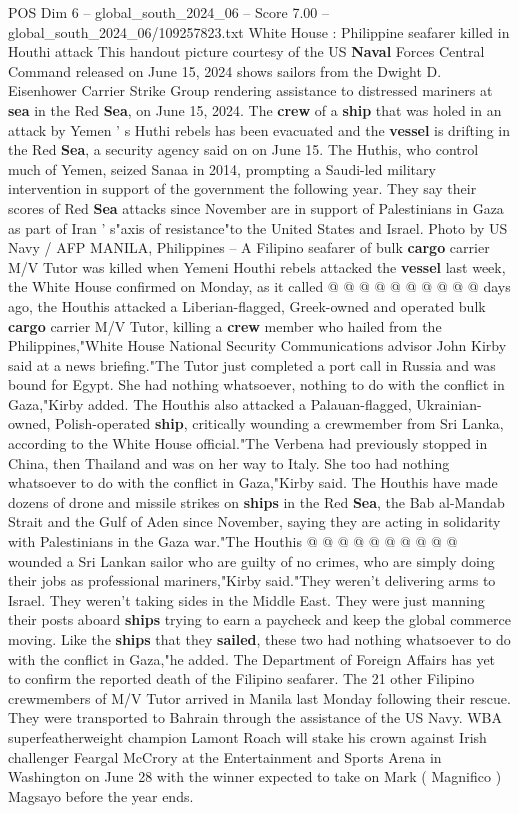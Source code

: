 \begin{textsample}{POS Dim 6 – global\_south\_2024\_06 – Score 7.00 – global\_south\_2024\_06/109257823.txt}  \label{ex:f6_pos_154}
White House : Philippine seafarer killed in Houthi attack This handout picture courtesy of the US \textbf{Naval} Forces Central Command released on June 15, 2024 shows sailors from the Dwight D.
Eisenhower Carrier Strike Group rendering assistance to distressed mariners at \textbf{sea} in the Red \textbf{Sea}, on June 15, 2024.
The \textbf{crew} of a \textbf{ship} that was holed in an attack by Yemen ' s Huthi rebels has been evacuated and the \textbf{vessel} is drifting in the Red \textbf{Sea}, a security agency said on on June 15.
The Huthis, who control much of Yemen, seized Sanaa in 2014, prompting a Saudi-led military intervention in support of the government the following year.
They say their scores of Red \textbf{Sea} attacks since November are in support of Palestinians in Gaza as part of Iran ' s"axis of resistance"to the United States and Israel.
Photo by US Navy / AFP MANILA, Philippines -- A Filipino seafarer of bulk \textbf{cargo} carrier M/V Tutor was killed when Yemeni Houthi rebels attacked the \textbf{vessel} last week, the White House confirmed on Monday, as it called @ @ @ @ @ @ @ @ @ @ days ago, the Houthis attacked a Liberian-flagged, Greek-owned and operated bulk \textbf{cargo} carrier M/V Tutor, killing a \textbf{crew} member who hailed from the Philippines,"White House National Security Communications advisor John Kirby said at a news briefing."The Tutor just completed a port call in Russia and was bound for Egypt.
She had nothing whatsoever, nothing to do with the conflict in Gaza,"Kirby added.
The Houthis also attacked a Palauan-flagged, Ukrainian-owned, Polish-operated \textbf{ship}, critically wounding a crewmember from Sri Lanka, according to the White House official."The Verbena had previously stopped in China, then Thailand and was on her way to Italy.
She too had nothing whatsoever to do with the conflict in Gaza,"Kirby said.
The Houthis have made dozens of drone and missile strikes on \textbf{ships} in the Red \textbf{Sea}, the Bab al-Mandab Strait and the Gulf of Aden since November, saying they are acting in solidarity with Palestinians in the Gaza war."The Houthis @ @ @ @ @ @ @ @ @ @ wounded a Sri Lankan sailor who are guilty of no crimes, who are simply doing their jobs as professional mariners,"Kirby said."They weren't delivering arms to Israel.
They weren't taking sides in the Middle East.
They were just manning their posts aboard \textbf{ships} trying to earn a paycheck and keep the global commerce moving.
Like the \textbf{ships} that they \textbf{sailed}, these two had nothing whatsoever to do with the conflict in Gaza,"he added.
The Department of Foreign Affairs has yet to confirm the reported death of the Filipino seafarer.
The 21 other Filipino crewmembers of M/V Tutor arrived in Manila last Monday following their rescue.
They were transported to Bahrain through the assistance of the US Navy.
WBA superfeatherweight champion Lamont Roach will stake his crown against Irish challenger Feargal McCrory at the Entertainment and Sports Arena in Washington on June 28 with the winner expected to take on Mark ( Magnifico ) Magsayo before the year ends.

\end{textsample}
